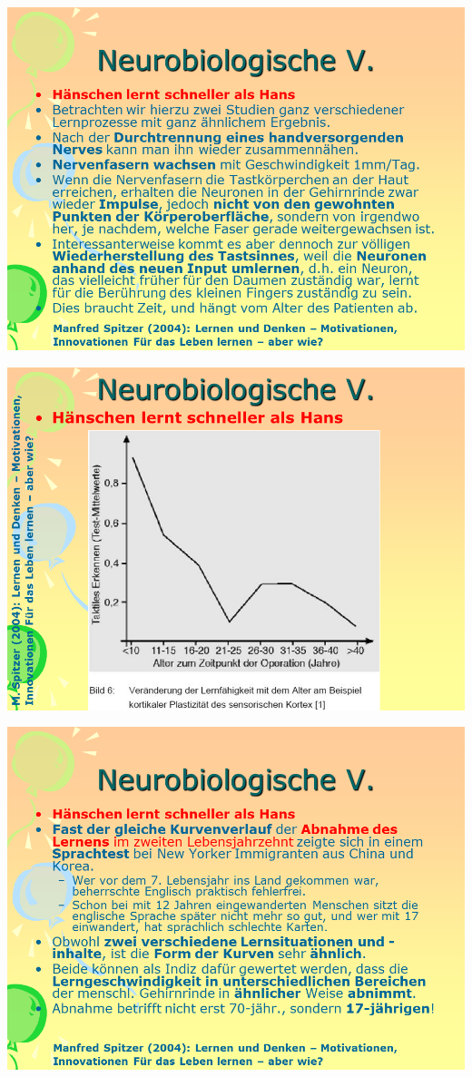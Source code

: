 \documentclass[
  letterpaper,
]{scrbook}
\begin{document}
\includegraphics[width=1\textwidth,height=\textheight]{./pictures/neuro/Diapozitiv70.PNG}

\includegraphics[width=1\textwidth,height=\textheight]{./pictures/neuro/Diapozitiv71.PNG}

\includegraphics[width=1\textwidth,height=\textheight]{./pictures/neuro/Diapozitiv72.PNG}
\end{document}
